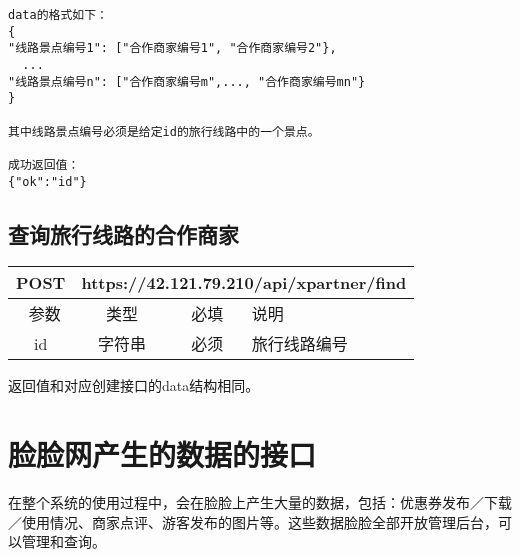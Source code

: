 \documentclass[cs4size]{ctexartutf8}
\begin{document}
\begin{verbatim}
data的格式如下：
{
"线路景点编号1": ["合作商家编号1", "合作商家编号2"},
  ...
"线路景点编号n": ["合作商家编号m",..., "合作商家编号mn"}
}

其中线路景点编号必须是给定id的旅行线路中的一个景点。

成功返回值：
{"ok":"id"}
\end{verbatim}



\subsection{查询旅行线路的合作商家}

\begin{table}[H]
   \begin{center}
\begin{tabular}{|c|c|c|p{12cm}|}
\hline
POST & \multicolumn{3}{|c|}{https://42.121.79.210/api/xpartner/find} \\
\hline\hline
 \  参数  & 类型 & 必填 &  说明  \\
 \hline
 id  & 字符串 & 必须 &  旅行线路编号\\
\hline
\end{tabular}
   \end{center}
\end{table}
返回值和对应创建接口的data结构相同。




\section{脸脸网产生的数据的接口}
在整个系统的使用过程中，会在脸脸上产生大量的数据，包括：优惠券发布／下载／使用情况、商家点评、游客发布的图片等。这些数据脸脸全部开放管理后台，可以管理和查询。



\newpage
\end{document}
